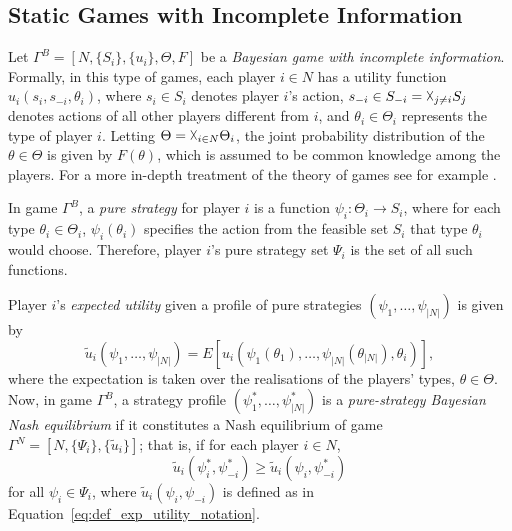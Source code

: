 \subsection{Static Games with Incomplete Information} %
\label{sub:static_games_with_incomplete_information_notation}
Let $\Gamma^B = [N, \{S_i\}, \{u_i\},\Theta,F]$ be a \emph{Bayesian game with incomplete information}. Formally, in this type of games, each player $i\in N$ has a utility function $u_i(s_i, s_{-i}, \theta_i)$, where $s_i\in S_i$ denotes player $i$'s action, $s_{-i}\in S_{-i} = \vartimes_{j\neq i}S_j$ denotes actions of all other players different from $i$, and $\theta_i\in\Theta_i$ represents the type of player $i$. Letting $\Theta = \vartimes_{i\in N} \Theta_i$, the joint probability distribution of the $\theta\in\Theta$ is given by $F(\theta)$, which is assumed to be common knowledge among the players. For a more in-depth treatment of the theory of games see for example \cite{Myerson97, Gibbons92, MicroTheory}.

In game $\Gamma^B$, a \emph{pure strategy} for player $i$ is a function $\psi_i: \Theta_i\to S_i$, where for each type $\theta_i\in \Theta_i$, $\psi_i(\theta_i)$ specifies the action from the feasible set $S_i$ that type $\theta_i$ would choose. Therefore, player $i$'s pure strategy set $\Psi_i$ is the set of all such functions.

Player $i$'s \emph{expected utility} given a profile of pure strategies $(\psi_1,\ldots,\psi_{|N|})$ is given by
\begin{equation}
	\label{eq:def_exp_utility_notation}
	\tilde{u}_i(\psi_1,\ldots,\psi_{|N|}) = E[u_i(\psi_1(\theta_1),\ldots,\psi_{|N|}(\theta_{|N|}),\theta_i)],
\end{equation}
where the expectation is taken over the realisations of the players' types, $\theta\in\Theta$. Now, in game $\Gamma^B$, a strategy profile $(\psi_1^*,\ldots,\psi_{|N|}^*)$ is a \emph{pure-strategy Bayesian Nash equilibrium} if it constitutes a Nash equilibrium of game $\Gamma^N = [N, \{\Psi_i\},\{\tilde{u}_i\}]$; that is, if for each player $i\in N$,
\begin{equation}
	\label{eq:def_bayesian_nash_eq_notation}
	\tilde{u}_i(\psi^*_i,\psi^*_{-i}) \ge \tilde{u}_i(\psi_i,\psi^*_{-i})
\end{equation}
for all $\psi_i\in\Psi_i$, where $\tilde{u}_i(\psi_i,\psi_{-i})$ is defined as in Equation~\eqref{eq:def_exp_utility_notation}.

